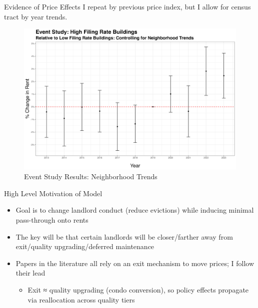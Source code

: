 \documentclass[10pt, xcolor=dvipsnames]{beamer}
\begin{document}
\begin{frame}{Evidence of Price Effects}
    I repeat by previous price index, but I allow for census tract by year trends.
    \small
    \begin{figure}
        \centering
        \includegraphics[width=0.65\linewidth]{figs/event_study_high_filing_preCOVID_m2.png}
        \caption{Event Study Results: Neighborhood Trends}
        \label{fig:placeholder}
    \end{figure}
    
\end{frame}


\begin{frame}{High Level Motivation of Model}
\begin{itemize}
    \item Goal is to change landlord conduct (reduce evictions) while inducing minimal pass-through onto rents
    \item The key will be that certain landlords will be closer/farther away from exit/quality upgrading/deferred maintenance 
    \item Papers in the literature \cite{diamond-2019, collinson2024eviction, } all rely on an exit mechanism to move prices; I follow their lead
    \begin{itemize}
        \item Exit ≈ quality upgrading (condo conversion), so policy effects propagate via reallocation across quality tiers
    \end{itemize}
\end{itemize}
    
\end{frame}
\end{document}
